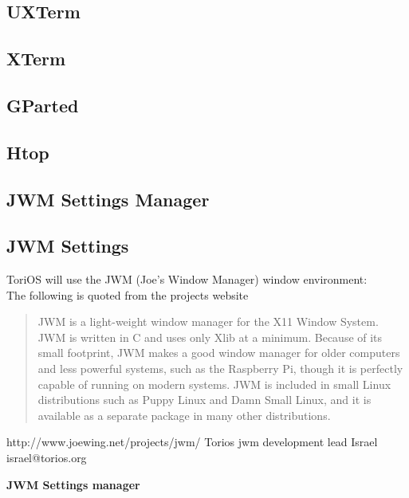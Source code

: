 \documentclass[12pt,a4paper]{book}
\begin{document}
\subsection{UXTerm}
\subsection{XTerm}
\subsection{GParted}
\subsection{Htop}

\subsection{JWM Settings Manager}


\subsection{JWM Settings}
ToriOS will use the JWM (Joe's Window Manager) window environment:\\

The following is quoted from the projects website

\begin{quote}
JWM is a light-weight window manager for the X11 Window System. JWM is written in C and uses only Xlib at a minimum. Because of its small footprint, JWM makes a good window manager for older computers and less powerful systems, such as the Raspberry Pi, though it is perfectly capable of running on modern systems. JWM is included in small Linux distributions such as Puppy Linux and Damn Small Linux, and it is available as a separate package in many other distributions. 
\end{quote}
http://www.joewing.net/projects/jwm/
Torios jwm development lead Israel israel@torios.org
\newpage

{\large \textbf{JWM Settings manager}} \\ \\
\end{document}
